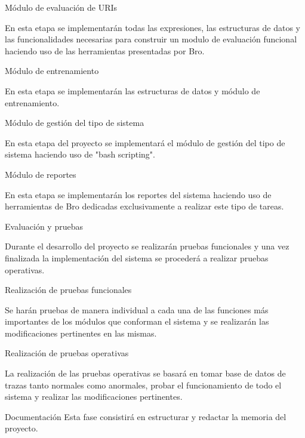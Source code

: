 \begin{legal}
\begin{legal}
\item Módulo de evaluación de URIs 

En esta etapa  se implementarán todas las expresiones, las estructuras de datos y las funcionalidades necesarias para construir un modulo de evaluación funcional haciendo uso de las herramientas presentadas por Bro. 

\item Módulo de entrenamiento 

En esta etapa se implementarán las estructuras de datos y módulo de entrenamiento.

\item Módulo de gestión del tipo de sistema

En esta etapa del proyecto se implementará el módulo de gestión del tipo de sistema haciendo uso de "bash scripting". 

\item Módulo de reportes

En esta etapa se implementarán los reportes del sistema haciendo uso de herramientas de Bro dedicadas exclusivamente a realizar este tipo de tareas.

\end{legal}
\item Evaluación y pruebas 

Durante el desarrollo del proyecto se realizarán pruebas funcionales y una vez finalizada la implementación del sistema se procederá a realizar pruebas operativas.
\begin{legal}
\item Realización de pruebas funcionales

Se harán pruebas de manera individual a cada una de las funciones más importantes de los módulos que conforman el sistema y se realizarán las modificaciones pertinentes en las mismas.

\item Realización de pruebas operativas

La realización de las pruebas operativas se basará en tomar base de datos de trazas tanto normales como anormales, probar el funcionamiento de todo el sistema y realizar las modificaciones pertinentes.

\end{legal}

\item Documentación  
 Esta fase consistirá en estructurar y redactar la memoria del proyecto.
\end{legal}

